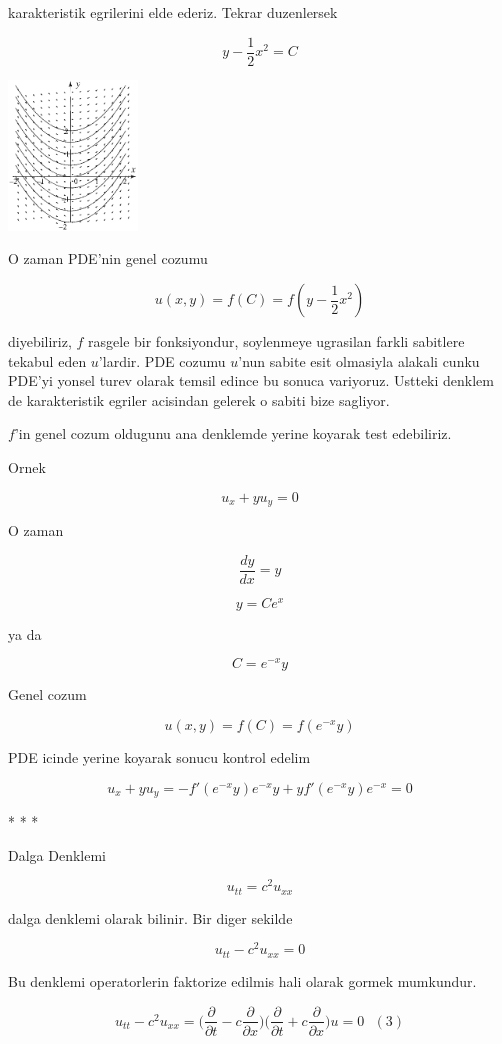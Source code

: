 \documentclass[12pt,fleqn]{article}
\begin{document}
karakteristik egrilerini elde ederiz. Tekrar duzenlersek

\[ y - \frac{1}{2}x^2 = C \]

\includegraphics[height=4cm]{2_1.png}

O zaman PDE'nin genel cozumu 

\[ u(x,y) = f(C) = f(y - \frac{1}{2}x^2) \]

diyebiliriz, $f$ rasgele bir fonksiyondur, soylenmeye ugrasilan farkli
sabitlere tekabul eden $u$'lardir. PDE cozumu $u$'nun sabite esit olmasiyla
alakali cunku PDE'yi yonsel turev olarak temsil edince bu sonuca
variyoruz. Ustteki denklem de karakteristik egriler acisindan gelerek o
sabiti bize sagliyor.

$f$'in genel cozum oldugunu ana denklemde yerine koyarak test edebiliriz.

Ornek 

\[ u_x + yu_y = 0 \]

O zaman 

\[ \frac{dy}{dx} = y \]

\[ y = Ce^x \]

ya da

\[  C = e^{-x}y\]

Genel cozum 

\[ u(x,y) = f(C) = f(e^{-x}y) \]

PDE icinde yerine koyarak sonucu kontrol edelim

\[ u_x + yu_y = 
-f'(e^{-x}y)e^{-x}y + y f'(e^{-x}y) e^{-x} = 0
 \]

* * *

Dalga Denklemi 

\[ u_{tt} = c^2 u_{xx} \]

dalga denklemi olarak bilinir. Bir diger sekilde 

\[ u_{tt} - c^2 u_{xx} = 0\]

Bu denklemi operatorlerin faktorize edilmis hali olarak gormek mumkundur. 

\[ u_{tt} - c^2 u_{xx} = 
\bigg( \frac{\partial }{\partial t} - c \frac{\partial }{\partial x} \bigg)
\bigg( \frac{\partial }{\partial t} + c \frac{\partial }{\partial x} \bigg)
u = 0
\ \ \ (3)
\]
\end{document}
